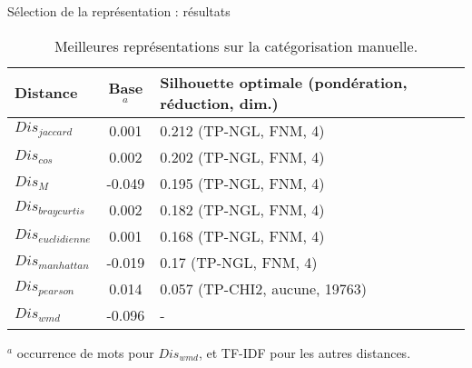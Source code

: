 \begin{frame}{Sélection de la représentation : résultats}
\begin{table}[!htb]
	\footnotesize
	\begin{center}
		\begin{tabular}[pos]{|l|c|p{}|}
			\hline
			\textbf{Distance}&\textbf{Base$^a$}&\textbf{Silhouette optimale   (pondération, réduction, dim.)} \\ \hline
			$Dis_{jaccard}$ & 0.001 & 0.212 (TP-NGL, FNM, 4) \\ \hline
			$Dis_{cos}$ & 0.002 & 0.202 (TP-NGL, FNM, 4) \\ \hline
			$Dis_{M}$ & -0.049 & 0.195 (TP-NGL, FNM, 4) \\ \hline
			$Dis_{braycurtis}$ & 0.002& 0.182 (TP-NGL, FNM, 4) \\ \hline
			$Dis_{euclidienne}$ & 0.001& 0.168  (TP-NGL, FNM, 4) \\ \hline
			$Dis_{manhattan}$ & -0.019& 0.17   (TP-NGL, FNM, 4) \\ \hline
			$Dis_{pearson}$ & 0.014 & 0.057 (TP-CHI2, aucune, 19763) \\ \hline
			$Dis_{wmd}$ & -0.096 &  - \\ \hline
		\end{tabular}				
	\end{center}
	
	$^a$ occurrence de mots pour $Dis_{wmd}$, et TF-IDF pour les autres distances.
	\caption{Meilleures représentations sur la catégorisation manuelle.} \label{tab:similarite:silhouette-vecteur-manuel}
\end{table}
\end{frame}

